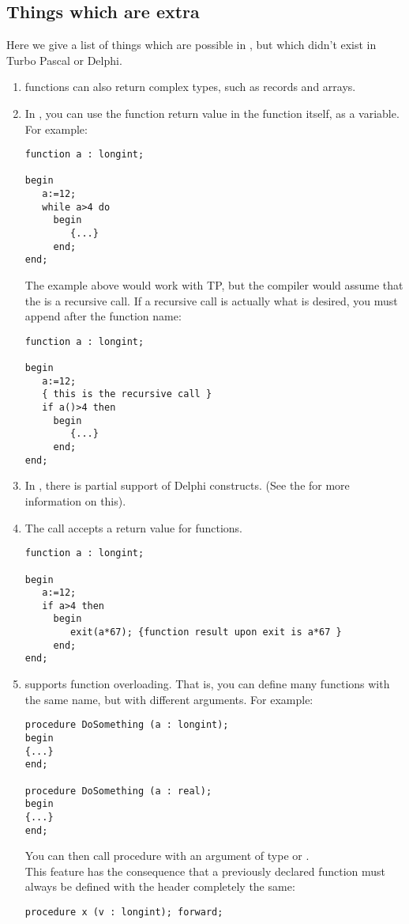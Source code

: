 \subsection{Things which are extra}
Here we give a list of things which are possible in \fpc, but which
didn't exist in Turbo Pascal or Delphi.
\begin{enumerate}
\item \fpc functions can also return complex types, such as records and arrays.
\item  In \fpc, you can use the function return value in the function itself, as a
variable. For example:
\begin{verbatim}
function a : longint;

begin
   a:=12;
   while a>4 do
     begin
        {...}
     end;
end;
\end{verbatim}
The example above would work with TP, but the compiler would assume
that the  is a recursive call. If a recursive call is actually what
is desired, you must append \var{()} after the function name:
\begin{verbatim}
function a : longint;

begin
   a:=12;
   { this is the recursive call }
   if a()>4 then
     begin
        {...}
     end;
end;
\end{verbatim}
\item In \fpc, there is partial support of Delphi constructs. (See the \progref for
more information on this).
\item The \fpc {} call accepts a return value for functions.
\begin{verbatim}
function a : longint;

begin
   a:=12;
   if a>4 then
     begin
        exit(a*67); {function result upon exit is a*67 }
     end;
end;
\end{verbatim}
\item \fpc supports function overloading. That is, you can define many
functions with the same name, but with different arguments. For example:
\begin{verbatim}
procedure DoSomething (a : longint);
begin
{...}
end;

procedure DoSomething (a : real);
begin
{...}
end;
\end{verbatim}
You can then call procedure  with an argument of type
 or .\\
This feature has the consequence that a previously declared function must
always be defined with the header completely the same:
\begin{verbatim}
procedure x (v : longint); forward;


\end{verbatim}
\end{enumerate}

